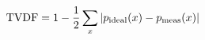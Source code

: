 \documentclass[preview]{standalone}
\begin{document}
\begin{align*}
\special{dvisvgm:raw <g id='unique000'>}\text{TVDF} = 1 - \frac{1}{2}\sum_x\left|p_{\text{ideal}}(x) - p_{\text{meas}}(x)\right|\special{dvisvgm:raw </g>}
\end{align*}
\end{document}
